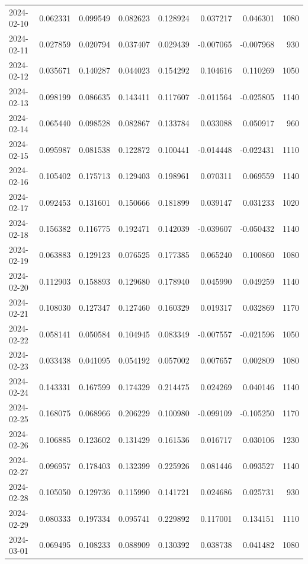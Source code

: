 \begin{tabular}{lrrrrrrr}
2024-02-10 & 0.062331 & 0.099549 & 0.082623 & 0.128924 & 0.037217 & 0.046301 & 1080 \\
2024-02-11 & 0.027859 & 0.020794 & 0.037407 & 0.029439 & -0.007065 & -0.007968 & 930 \\
2024-02-12 & 0.035671 & 0.140287 & 0.044023 & 0.154292 & 0.104616 & 0.110269 & 1050 \\
2024-02-13 & 0.098199 & 0.086635 & 0.143411 & 0.117607 & -0.011564 & -0.025805 & 1140 \\
2024-02-14 & 0.065440 & 0.098528 & 0.082867 & 0.133784 & 0.033088 & 0.050917 & 960 \\
2024-02-15 & 0.095987 & 0.081538 & 0.122872 & 0.100441 & -0.014448 & -0.022431 & 1110 \\
2024-02-16 & 0.105402 & 0.175713 & 0.129403 & 0.198961 & 0.070311 & 0.069559 & 1140 \\
2024-02-17 & 0.092453 & 0.131601 & 0.150666 & 0.181899 & 0.039147 & 0.031233 & 1020 \\
2024-02-18 & 0.156382 & 0.116775 & 0.192471 & 0.142039 & -0.039607 & -0.050432 & 1140 \\
2024-02-19 & 0.063883 & 0.129123 & 0.076525 & 0.177385 & 0.065240 & 0.100860 & 1080 \\
2024-02-20 & 0.112903 & 0.158893 & 0.129680 & 0.178940 & 0.045990 & 0.049259 & 1140 \\
2024-02-21 & 0.108030 & 0.127347 & 0.127460 & 0.160329 & 0.019317 & 0.032869 & 1170 \\
2024-02-22 & 0.058141 & 0.050584 & 0.104945 & 0.083349 & -0.007557 & -0.021596 & 1050 \\
2024-02-23 & 0.033438 & 0.041095 & 0.054192 & 0.057002 & 0.007657 & 0.002809 & 1080 \\
2024-02-24 & 0.143331 & 0.167599 & 0.174329 & 0.214475 & 0.024269 & 0.040146 & 1140 \\
2024-02-25 & 0.168075 & 0.068966 & 0.206229 & 0.100980 & -0.099109 & -0.105250 & 1170 \\
2024-02-26 & 0.106885 & 0.123602 & 0.131429 & 0.161536 & 0.016717 & 0.030106 & 1230 \\
2024-02-27 & 0.096957 & 0.178403 & 0.132399 & 0.225926 & 0.081446 & 0.093527 & 1140 \\
2024-02-28 & 0.105050 & 0.129736 & 0.115990 & 0.141721 & 0.024686 & 0.025731 & 930 \\
2024-02-29 & 0.080333 & 0.197334 & 0.095741 & 0.229892 & 0.117001 & 0.134151 & 1110 \\
2024-03-01 & 0.069495 & 0.108233 & 0.088909 & 0.130392 & 0.038738 & 0.041482 & 1080 \\

\end{tabular}
